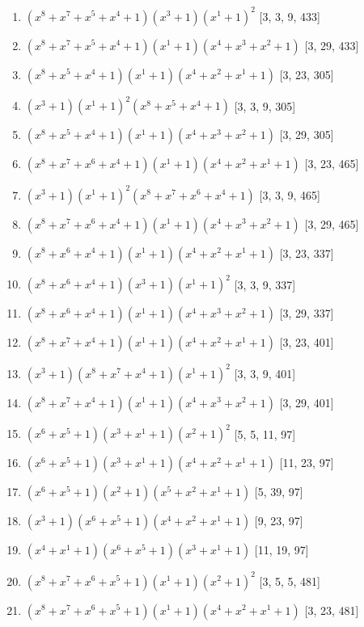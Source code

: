 \documentclass[10pt,twocolumn]{article}
\begin{document}
\begin{enumerate}
\item $(x^{8} + x^{7} + x^{5} + x^{4} + 1)(x^{3} + 1)(x^{1} + 1)^{2}$  [3, 3, 9, 433]
\item $(x^{8} + x^{7} + x^{5} + x^{4} + 1)(x^{1} + 1)(x^{4} + x^{3} + x^{2} + 1)$  [3, 29, 433]
\item $(x^{8} + x^{5} + x^{4} + 1)(x^{1} + 1)(x^{4} + x^{2} + x^{1} + 1)$  [3, 23, 305]
\item $(x^{3} + 1)(x^{1} + 1)^{2}(x^{8} + x^{5} + x^{4} + 1)$  [3, 3, 9, 305]
\item $(x^{8} + x^{5} + x^{4} + 1)(x^{1} + 1)(x^{4} + x^{3} + x^{2} + 1)$  [3, 29, 305]
\item $(x^{8} + x^{7} + x^{6} + x^{4} + 1)(x^{1} + 1)(x^{4} + x^{2} + x^{1} + 1)$  [3, 23, 465]
\item $(x^{3} + 1)(x^{1} + 1)^{2}(x^{8} + x^{7} + x^{6} + x^{4} + 1)$  [3, 3, 9, 465]
\item $(x^{8} + x^{7} + x^{6} + x^{4} + 1)(x^{1} + 1)(x^{4} + x^{3} + x^{2} + 1)$  [3, 29, 465]
\item $(x^{8} + x^{6} + x^{4} + 1)(x^{1} + 1)(x^{4} + x^{2} + x^{1} + 1)$  [3, 23, 337]
\item $(x^{8} + x^{6} + x^{4} + 1)(x^{3} + 1)(x^{1} + 1)^{2}$  [3, 3, 9, 337]
\item $(x^{8} + x^{6} + x^{4} + 1)(x^{1} + 1)(x^{4} + x^{3} + x^{2} + 1)$  [3, 29, 337]
\item $(x^{8} + x^{7} + x^{4} + 1)(x^{1} + 1)(x^{4} + x^{2} + x^{1} + 1)$  [3, 23, 401]
\item $(x^{3} + 1)(x^{8} + x^{7} + x^{4} + 1)(x^{1} + 1)^{2}$  [3, 3, 9, 401]
\item $(x^{8} + x^{7} + x^{4} + 1)(x^{1} + 1)(x^{4} + x^{3} + x^{2} + 1)$  [3, 29, 401]
\item $(x^{6} + x^{5} + 1)(x^{3} + x^{1} + 1)(x^{2} + 1)^{2}$  [5, 5, 11, 97]
\item $(x^{6} + x^{5} + 1)(x^{3} + x^{1} + 1)(x^{4} + x^{2} + x^{1} + 1)$  [11, 23, 97]
\item $(x^{6} + x^{5} + 1)(x^{2} + 1)(x^{5} + x^{2} + x^{1} + 1)$  [5, 39, 97]
\item $(x^{3} + 1)(x^{6} + x^{5} + 1)(x^{4} + x^{2} + x^{1} + 1)$  [9, 23, 97]
\item $(x^{4} + x^{1} + 1)(x^{6} + x^{5} + 1)(x^{3} + x^{1} + 1)$  [11, 19, 97]
\item $(x^{8} + x^{7} + x^{6} + x^{5} + 1)(x^{1} + 1)(x^{2} + 1)^{2}$  [3, 5, 5, 481]
\item $(x^{8} + x^{7} + x^{6} + x^{5} + 1)(x^{1} + 1)(x^{4} + x^{2} + x^{1} + 1)$  [3, 23, 481]

\end{enumerate}
\end{document}
